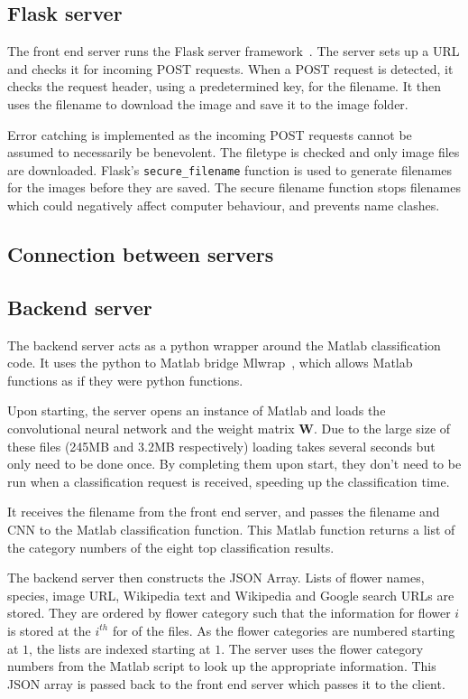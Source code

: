 \documentclass[11pt, a4paper]{report}
\newcommand{\vect}[1]{\boldsymbol{#1}}
\begin{document}
\subsection{Flask server}

The front end server runs the Flask server framework~\cite{Server:Flask}. The server sets up a URL and checks it for incoming POST requests. When a POST request is detected, it checks the request header, using a predetermined key, for the filename. It then uses the filename to download the image and save it to the image folder. 

Error catching is implemented as the incoming POST requests cannot be assumed to necessarily be benevolent. The filetype is checked and only image files are downloaded. Flask's \verb|secure_filename| function is used to generate filenames for the images before they are saved. The secure filename function stops filenames which could negatively affect computer behaviour, and prevents name clashes.

\subsection{Connection between servers}

\subsection{Backend server}

The backend server acts as a python wrapper around the Matlab classification code. It uses the python to Matlab bridge Mlwrap~\cite{Server:Mlwrap}, which allows Matlab functions as if they were python functions. 


Upon starting, the server opens an instance of Matlab and loads the convolutional neural network and the weight matrix $\vect{W}$. Due to the large size of these files (245MB and 3.2MB respectively) loading takes several seconds but only need to be done once. By completing them upon start, they don't need to be run when a classification request is received, speeding up the classification time. 

It receives the filename from the front end server, and passes the filename and CNN to the Matlab classification function. This Matlab function returns a list of the category numbers of the eight top classification results. 

The backend server then constructs the JSON Array. Lists of flower names, species, image URL, Wikipedia text and Wikipedia and Google search URLs are stored. They are ordered by flower category such that the information for flower $i$ is stored at the $i^{th}$ for of the files. As the flower categories are numbered starting at $1$, the lists are indexed starting at $1$. The server uses the flower category numbers from the Matlab script to look up the appropriate information. This JSON array is passed back to the front end server which passes it to the client. 
\end{document}
